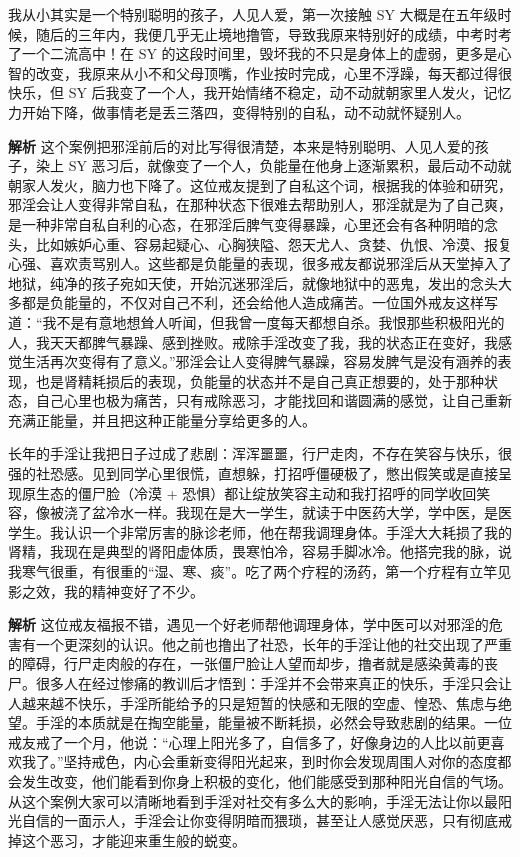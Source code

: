 \begin{case}
    我从小其实是一个特别聪明的孩子，人见人爱，第一次接触 SY 大概是在五年级时候，随后的三年内，我便几乎无止境地撸管，导致我原来特别好的成绩，中考时考了一个二流高中！在 SY 的这段时间里，毁坏我的不只是身体上的虚弱，更多是心智的改变，我原来从小不和父母顶嘴，作业按时完成，心里不浮躁，每天都过得很快乐，但 SY 后我变了一个人，我开始情绪不稳定，动不动就朝家里人发火，记忆力开始下降，做事情老是丢三落四，变得特别的自私，动不动就怀疑别人。

    \textbf{解析} 这个案例把邪淫前后的对比写得很清楚，本来是特别聪明、人见人爱的孩子，染上 SY 恶习后，就像变了一个人，负能量在他身上逐渐累积，最后动不动就朝家人发火，脑力也下降了。这位戒友提到了自私这个词，根据我的体验和研究，邪淫会让人变得非常自私，在那种状态下很难去帮助别人，邪淫就是为了自己爽，是一种非常自私自利的心态，在邪淫后脾气变得暴躁，心里还会有各种阴暗的念头，比如嫉妒心重、容易起疑心、心胸狭隘、怨天尤人、贪婪、仇恨、冷漠、报复心强、喜欢责骂别人。这些都是负能量的表现，很多戒友都说邪淫后从天堂掉入了地狱，纯净的孩子宛如天使，开始沉迷邪淫后，就像地狱中的恶鬼，发出的念头大多都是负能量的，不仅对自己不利，还会给他人造成痛苦。一位国外戒友这样写道：“我不是有意地想耸人听闻，但我曾一度每天都想自杀。我恨那些积极阳光的人，我天天都脾气暴躁、感到挫败。戒除手淫改变了我，我的状态正在变好，我感觉生活再次变得有了意义。”邪淫会让人变得脾气暴躁，容易发脾气是没有涵养的表现，也是肾精耗损后的表现，负能量的状态并不是自己真正想要的，处于那种状态，自己心里也极为痛苦，只有戒除恶习，才能找回和谐圆满的感觉，让自己重新充满正能量，并且把这种正能量分享给更多的人。
\end{case}

\begin{case}
    长年的手淫让我把日子过成了悲剧：浑浑噩噩，行尸走肉，不存在笑容与快乐，很强的社恐感。见到同学心里很慌，直想躲，打招呼僵硬极了，憋出假笑或是直接呈现原生态的僵尸脸（冷漠 + 恐惧）都让绽放笑容主动和我打招呼的同学收回笑容，像被浇了盆冷水一样。我现在是大一学生，就读于中医药大学，学中医，是医学生。我认识一个非常厉害的脉诊老师，他在帮我调理身体。手淫大大耗损了我的肾精，我现在是典型的肾阳虚体质，畏寒怕冷，容易手脚冰冷。他搭完我的脉，说我寒气很重，有很重的“湿、寒、痰”。吃了两个疗程的汤药，第一个疗程有立竿见影之效，我的精神变好了不少。

    \textbf{解析} 这位戒友福报不错，遇见一个好老师帮他调理身体，学中医可以对邪淫的危害有一个更深刻的认识。他之前也撸出了社恐，长年的手淫让他的社交出现了严重的障碍，行尸走肉般的存在，一张僵尸脸让人望而却步，撸者就是感染黄毒的丧尸。很多人在经过惨痛的教训后才悟到：手淫并不会带来真正的快乐，手淫只会让人越来越不快乐，手淫所能给予的只是短暂的快感和无限的空虚、惶恐、焦虑与绝望。手淫的本质就是在掏空能量，能量被不断耗损，必然会导致悲剧的结果。一位戒友戒了一个月，他说：“心理上阳光多了，自信多了，好像身边的人比以前更喜欢我了。”坚持戒色，内心会重新变得阳光起来，到时你会发现周围人对你的态度都会发生改变，他们能看到你身上积极的变化，他们能感受到那种阳光自信的气场。从这个案例大家可以清晰地看到手淫对社交有多么大的影响，手淫无法让你以最阳光自信的一面示人，手淫会让你变得阴暗而猥琐，甚至让人感觉厌恶，只有彻底戒掉这个恶习，才能迎来重生般的蜕变。
\end{case}

